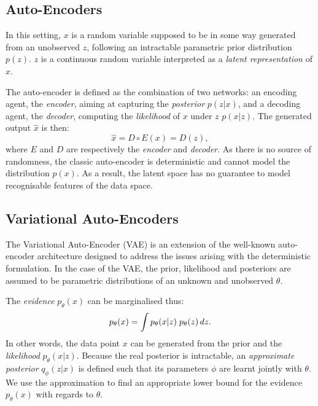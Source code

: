\documentclass{article}
\begin{document}
\subsection{Auto-Encoders}
\label{subsec:ae}


In this setting, $x$ is a random variable supposed to be in some way generated from an unobserved $z$,
following an intractable parametric prior distribution $p(z)$.
$z$ is a continuous random variable interpreted as a \emph{latent representation} of $x$.

The auto-encoder is defined as the combination of two networks:
an encoding agent, the \emph{encoder}, aiming at capturing the \emph{posterior} $p(z|x)$, 
and a decoding agent, the \emph{decoder}, computing the \emph{likelihood} of $x$ under $z$ $p(x|z)$.
The generated output $\hat{x}$ is then:
\begin{equation}
    \hat{x} = D \circ E(x) = D(z),
    \label{eq:ae_form}
\end{equation}
where $E$ and $D$ are respectively the \emph{encoder} and \emph{decoder}.
As there is no source of randomness, the classic auto-encoder is deterministic
and cannot model the distribution $p(x)$.
As a result, the latent space has no guarantee to
model recognisable features of the data space.

\subsection{Variational Auto-Encoders}
\label{subsec:vae}

The Variational Auto-Encoder (VAE) is an extension of the well-known auto-encoder
architecture designed to address the issues arising with the deterministic formulation.
In the case of the VAE, the prior, likelihood and
posteriors are assumed to be parametric distributions
of an unknown and unobserved $\theta$.

The \emph{evidence} $p_{\theta}(x)$ can be marginalised thus:
\begin{equation}
    \centering
    p_\theta(x) = \int p_\theta(x|z) \; p_\theta(z) \,dz.
    \label{eq:vae_marg}
\end{equation}
In other words, the data point $x$ can be generated from the prior and the \emph{likelihood} $p_\theta(x|z)$.
Because the real posterior is intractable, an \emph{approximate posterior}
$q_\phi(z|x)$ is defined such that its parameters $\phi$ are learnt jointly with $\theta$.
We use the approximation to find an appropriate lower bound for
the evidence $p_{\theta}(x)$ with regards to $\theta$.
\end{document}
